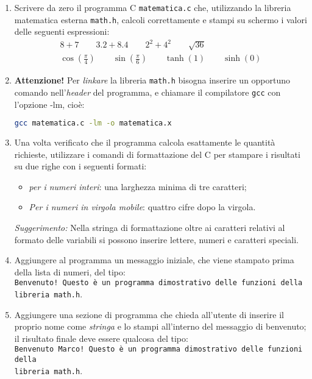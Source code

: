\documentclass[11pt]{article}
\begin{document}
\begin{enumerate}
\item Scrivere da zero il programma C \texttt{matematica.c} che, utilizzando la libreria matematica esterna \texttt{math.h}, calcoli correttamente e stampi su schermo i valori delle seguenti espressioni:
  \begin{eqnarray*}
    8+7 \qquad  3.2 + 8.4 \qquad 2^2+4^2 \qquad  \sqrt{36}
    \\
    \cos \left(\frac{\pi}{4}\right) \qquad \sin\left(\frac{\pi}{6}\right)
    \qquad
    \tanh\left(1\right) \qquad \sinh\left(0\right)
    \end{eqnarray*}

\item {\bf Attenzione!} Per {\em linkare\/} la libreria \texttt{math.h} bisogna inserire un opportuno comando
nell'{\em header\/} del programma, e chiamare il compilatore \texttt{gcc} con l'opzione -lm, cio\`e:\\
\begin{lstlisting}[language=bash]
  gcc matematica.c -lm -o matematica.x
\end{lstlisting} 
\item Una volta verificato che il programma calcola esattamente le quantit\`a richieste, utilizzare i comandi di formattazione del C per stampare i risultati
  su due righe con i seguenti formati:
\begin{itemize}
  \item {\em per i numeri interi\/}: una larghezza minima di tre caratteri;
  \item {\em Per i numeri in virgola mobile\/}: quattro cifre dopo la virgola.
\end{itemize}
    {\em Suggerimento:\/} Nella stringa di formattazione oltre ai caratteri relativi al formato delle variabili si possono
    inserire lettere, numeri e caratteri speciali.
  \item Aggiungere al programma un messaggio iniziale, che viene stampato prima della lista di numeri, del tipo:\\
\texttt{Benvenuto! Questo \`e un programma dimostrativo delle funzioni della libreria math.h}.
\item Aggiungere una sezione di programma che chieda all'utente di inserire il proprio nome come {\em stringa\/}
e lo stampi all'interno del messaggio di benvenuto; il risultato finale deve essere qualcosa del tipo:\\
\texttt{Benvenuto Marco! Questo \`e un programma dimostrativo delle funzioni della}\\
\texttt{libreria math.h}.
\end{enumerate}
\end{document}
